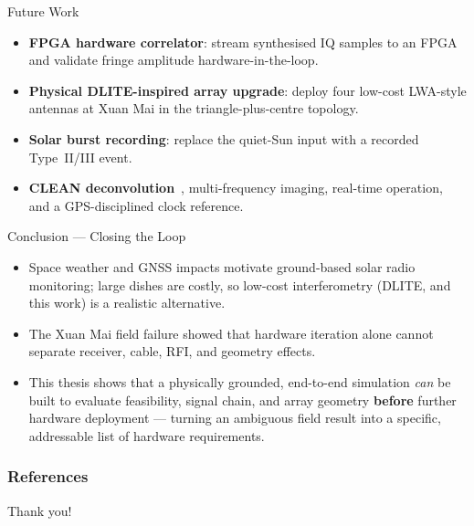 \documentclass{beamer}
\begin{document}
\begin{frame}{Future Work}
\begin{itemize}
  \item \textbf{FPGA hardware correlator}: stream synthesised IQ samples to an
  FPGA and validate fringe amplitude hardware-in-the-loop.
  \item \textbf{Physical DLITE-inspired array upgrade}: deploy four low-cost
  LWA-style antennas at Xuan Mai in the triangle-plus-centre topology.
  \item \textbf{Solar burst recording}: replace the quiet-Sun input with a
  recorded Type~II/III event.
  \item \textbf{CLEAN deconvolution}~\cite{hogbom1974}, multi-frequency
  imaging, real-time operation, and a GPS-disciplined clock reference.
\end{itemize}
\end{frame}

\begin{frame}{Conclusion --- Closing the Loop}
\begin{itemize}
  \item Space weather and GNSS impacts motivate ground-based solar radio
  monitoring; large dishes are costly, so low-cost interferometry (DLITE, and
  this work) is a realistic alternative.
  \item The Xuan Mai field failure showed that hardware iteration alone
  cannot separate receiver, cable, RFI, and geometry effects.
  \item This thesis shows that a physically grounded, end-to-end simulation
  \emph{can} be built to evaluate feasibility, signal chain, and array
  geometry \textbf{before} further hardware deployment ---
  turning an ambiguous field result into a specific, addressable list of
  hardware requirements.
\end{itemize}
\end{frame}

\begin{frame}[allowframebreaks]
\frametitle{References}
\tiny{

}
\end{frame}

\begin{frame}
\Huge{\centerline{Thank you!}}
\end{frame}
\end{document}
